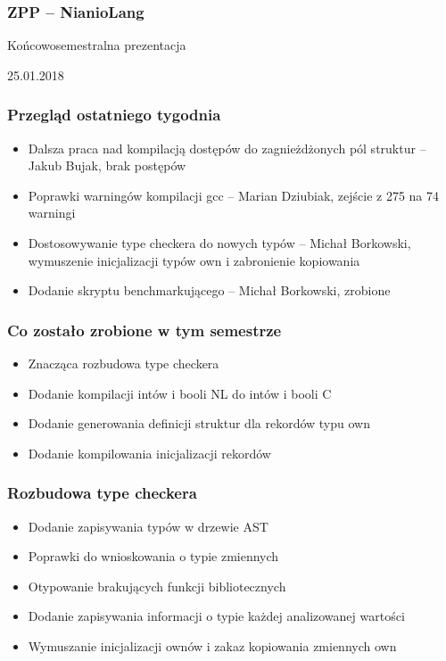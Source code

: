 \documentclass{beamer}
\begin{document}
	\begin{frame}
		\frametitle{ZPP -- NianioLang}
		Końcowosemestralna prezentacja
		
		25.01.2018
	\end{frame}
	
	\begin{frame}
		\frametitle{Przegląd ostatniego tygodnia}
		\begin{itemize}
			\item Dalsza praca nad kompilacją dostępów do zagnieżdżonych pól struktur
			-- Jakub Bujak, brak postępów
			\item Poprawki warningów kompilacji gcc -- Marian Dziubiak, zejście z 275 na 74 warningi
			\item Dostosowywanie type checkera do nowych typów -- Michał Borkowski, wymuszenie
			inicjalizacji typów own i zabronienie kopiowania
			\item Dodanie skryptu benchmarkującego -- Michał Borkowski, zrobione
		\end{itemize}
	\end{frame}
	
	\begin{frame}
		\frametitle{Co zostało zrobione w tym semestrze}
		\begin{itemize}
			\item Znacząca rozbudowa type checkera
			\item Dodanie kompilacji intów i booli NL do intów i booli C
			\item Dodanie generowania definicji struktur dla rekordów typu own
			\item Dodanie kompilowania inicjalizacji rekordów
		\end{itemize}
	\end{frame}
	
	\begin{frame}
		\frametitle{Rozbudowa type checkera}
		\begin{itemize}
			\item Dodanie zapisywania typów w drzewie AST
			\item Poprawki do wnioskowania o typie zmiennych
			\item Otypowanie brakujących funkcji bibliotecznych
			\item Dodanie zapisywania informacji o typie każdej analizowanej wartości
			\item Wymuszanie inicjalizacji ownów i zakaz kopiowania zmiennych own
		\end{itemize}
	\end{frame}
	
\end{document}
